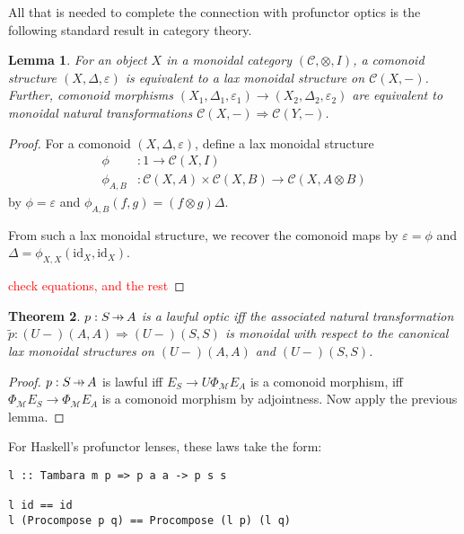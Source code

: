 \documentclass[11pt,letterpaper]{article}
\theoremstyle{plain}
\newtheorem{theorem}{Theorem}[subsection]
\newtheorem{lemma}[theorem]{Lemma}
\theoremstyle{definition}
\newcommand{\C}{\mathscr{C}}
\newcommand{\M}{\mathscr{M}}
\newcommand{\id}{\mathrm{id}}
\newcommand{\hto}{\ensuremath{\,\mathaccent\shortmid\rightarrow\,}}
\newcommand{\todo}[1]{\textcolor{red}{\small #1}}
\begin{document}
All that is needed to complete the connection with profunctor optics is the following standard result in category theory.

\begin{lemma}
  For an object $X$ in a monoidal category $(\C, \otimes, I)$, a comonoid structure $(X,\Delta,\varepsilon)$ is equivalent to a lax monoidal structure on $\C(X, -)$. Further, comonoid morphisms $(X_1,\Delta_1,\varepsilon_1) \to (X_2,\Delta_2,\varepsilon_2)$ are equivalent to monoidal natural transformations $\C(X, -) \Rightarrow \C(Y, -)$.
\end{lemma}
\begin{proof}
  For a comonoid $(X,\Delta,\varepsilon)$, define a lax monoidal structure
  \begin{align*}
    \phi &: 1 \to \C(X, I) \\
    \phi_{A, B} &: \C(X, A) \times \C(X, B) \to \C(X, A \otimes B)
  \end{align*}
  by $\phi = \varepsilon$ and $\phi_{A, B}(f, g) = (f \otimes g) \Delta$.

  From such a lax monoidal structure, we recover the comonoid maps by $\varepsilon = \phi$ and $\Delta = \phi_{X, X}(\id_X, \id_X)$.

  \todo{check equations, and the rest}
\end{proof}

\begin{theorem}
  $p : S \hto A$ is a lawful optic iff the associated natural transformation $\tilde{p} : (U-)(A,A) \Rightarrow (U-)(S,S)$ is monoidal with respect to the canonical lax monoidal structures on $(U-)(A,A)$ and $(U-)(S,S)$.
\end{theorem}
\begin{proof}
  $p : S \hto A$ is lawful iff $E_S \rightarrow U \Phi_\M E_A$ is a comonoid morphism, iff $\Phi_\M E_S \rightarrow \Phi_\M E_A$ is a comonoid morphism by adjointness. Now apply the previous lemma.
\end{proof}

  For Haskell's profunctor lenses, these laws take the form:
\begin{verbatim}
l :: Tambara m p => p a a -> p s s

l id == id
l (Procompose p q) == Procompose (l p) (l q)
\end{verbatim}
\end{document}
